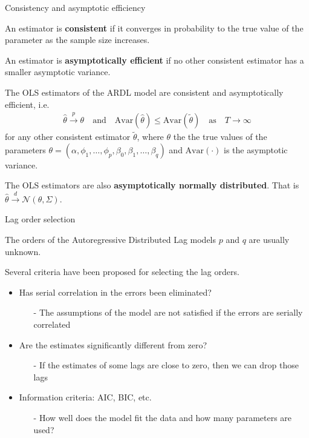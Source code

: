 \documentclass[10pt,aspectratio=169]{beamer}  %
\begin{document}
\begin{frame}{Consistency and asymptotic efficiency}

    \bigskip
    An estimator is \textbf{consistent} if it converges in probability to the true value of the parameter as the sample size increases.

    \medskip
    An estimator is \textbf{asymptotically efficient} if no other consistent estimator has a smaller asymptotic variance.

    \medskip
    The OLS estimators of the ARDL model are consistent and asymptotically efficient, i.e.
    \begin{align*}
        \widehat{\theta} \overset{p}{\to} \theta \quad \text{and} \quad \mathrm{Avar}(\widehat{\theta}) \leq \mathrm{Avar}(\widetilde{\theta}) \quad \text{as} \quad T \to \infty
    \end{align*}
    for any other consistent estimator $ \widetilde{\theta} $, where $ \theta $ the the true values of the parameters $ \theta = (\alpha, \phi_{1}, \ldots, \phi_{p}, \beta_{0}, \beta_{1}, \ldots, \beta_{q}) $ and $ \mathrm{Avar}(\cdot) $ is the asymptotic variance.

    \medskip
    The OLS estimators are also \textbf{asymptotically normally distributed}. That is $ \widehat{\theta} \overset{d}{\to} \mathcal{N}(\theta, \Sigma) $.

\end{frame}


\begin{frame}{Lag order selection}

    \bigskip
    The orders of the Autoregressive Distributed Lag models $ p $ and $ q $ are usually unknown.

    \medskip
    Several criteria have been proposed for selecting the lag orders.
    \begin{itemize}\itemsep=1em
        \item Has serial correlation in the errors been eliminated?
        \begin{itemize}
            \item[-] The assumptions of the model are not satisfied if the errors are serially correlated
        \end{itemize}
        \item Are the estimates significantly different from zero?
        \begin{itemize}
            \item[-] If the estimates of some lags are close to zero, then we can drop those lags
        \end{itemize}
        \item Information criteria: AIC, BIC, etc.
        \begin{itemize}
            \item[-] How well does the model fit the data and how many parameters are used?
        \end{itemize}
    \end{itemize}

\end{frame}
\end{document}
